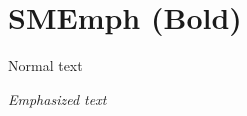 \documentclass[class=scrartcl,crop=false]{standalone}
\begin{document}
\section{SMEmph (Bold)}

Normal text

\emph{Emphasized text}

\end{document}
